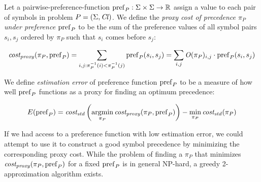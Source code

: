 
Let a \gls{pairwise-preference-function}
\(\operatorname{pref}_P : \Sigma \times \Sigma \rightarrow \operatorname{\mathbb{R}}\)
assign a value to each pair of symbols in problem \(P = (\Sigma, \operatorname{\mathit{Cl}})\).
We define the \emph{proxy cost of precedence \(\pi_P\) under preference \(\operatorname{pref}_P\)}
to be the sum of the preference values of all symbol pairs \(s_i, s_j\)
ordered by \(\pi_P\) such that \(s_i\) comes before \(s_j\):

\begin{align*}
\operatorname{\mathit{cost_{proxy}}}(\pi_P, \operatorname{pref}_P) = \sum_{i, j: \pi_P^{-1}(i) < \pi_P^{-1}(j)} \operatorname{pref}_P(s_i, s_j)
= \sum_{i, j} \operatorname{\mathit{O}}(\pi_P)_{i, j} \cdot \operatorname{pref}_P(s_i, s_j)
\end{align*}

We define \emph{estimation error}
of preference function \(\operatorname{pref}_P\) to be a measure
of how well \(\operatorname{pref}_P\) functions as a proxy for finding an optimum precedence:

\begin{align*}
E(\operatorname{pref}_P) = \operatorname{\mathit{cost_{std}}} \left ( \operatorname*{argmin}_{\pi_P} \operatorname{\mathit{cost_{proxy}}}(\pi_P, \operatorname{pref}_P) \right ) - \min_{\pi_P} \operatorname{\mathit{cost_{std}}}(\pi_P)
\end{align*}

If we had access to a preference function with low estimation error,
we could attempt to use it to construct a good symbol precedence
by minimizing the corresponding proxy cost.
While the problem of finding a \(\pi_P\) that minimizes \(\operatorname{\mathit{cost_{proxy}}}(\pi_P, \operatorname{pref}_P)\)
for a fixed \(\operatorname{pref}_P\) is in general NP-hard, a greedy 2-approximation algorithm exists. \cite{Cohen2011}

